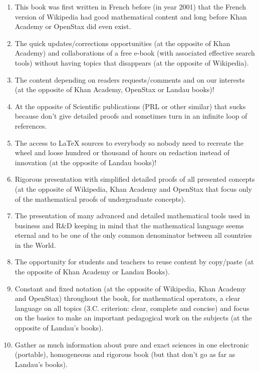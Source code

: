 \begin{enumerate}
		\item This book was first written in French before (in year 2001) that the French version of Wikipedia had good mathematical content and long before Khan Academy or OpenStax did even exist.

		\item The quick updates/corrections opportunities (at the opposite of Khan Academy) and collaborations of a free e-book (with associated effective search tools) without having topics that disappears (at the opposite of Wikipedia).

		\item The content depending on readers requests/comments and on our interests (at the opposite of Khan Academy, OpenStax or Landau books)!
		
		\item At the opposite of Scientific publications (PRL or other similar) that sucks because don't give detailed proofs and sometimes turn in an infinite loop of references.
		
		\item The access to \LaTeX{} sources to everybody so nobody need to recreate the wheel and loose hundred or thousand of hours on redaction instead of innovation (at the opposite of Landau books)!

		\item Rigorous presentation with simplified detailed proofs of all presented concepts (at the opposite of Wikipedia, Khan Academy and OpenStax that focus only of the mathematical proofs of undergraduate concepts).

		\item The presentation of many advanced and detailed mathematical tools used in business and R\&D keeping in mind that the mathematical language seems eternal and to be one of the only common denominator between all countries in the World.

		\item The opportunity for students and teachers to reuse content by copy/paste (at the opposite of Khan Academy or Landau Books).

		\item Constant and fixed notation (at the opposite of Wikipedia, Khan Academy and OpenStax) throughout the book, for mathematical operators, a clear language on all topics (3.C. criterion: clear, complete and concise) and focus on the basics to make an important pedagogical work on the subjects (at the opposite of Landau's books).

		\item Gather as much information about pure and exact sciences in one electronic (portable), homogeneous and rigorous book (but that don't go as far as Landau's books).


\end{enumerate}
